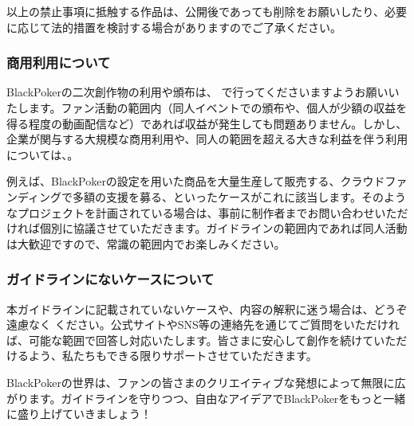 \documentclass[letterpaper,10pt,dvipdfmx]{sphinxmanual}
\begin{document}
\sphinxAtStartPar
以上の禁止事項に抵触する作品は、公開後であっても削除をお願いしたり、必要に応じて法的措置を検討する場合がありますのでご了承ください。


\subsubsection{商用利用について}
\label{\detokenize{appendix/guideline/fanworks:id7}}
\sphinxAtStartPar
BlackPokerの二次創作物の利用や頒布は、  で行ってくださいますようお願いいたします。ファン活動の範囲内（同人イベントでの頒布や、個人が少額の収益を得る程度の動画配信など）であれば収益が発生しても問題ありません。しかし、企業が関与する大規模な商用利用や、同人の範囲を超える大きな利益を伴う利用については、。

\sphinxAtStartPar
例えば、BlackPokerの設定を用いた商品を大量生産して販売する、クラウドファンディングで多額の支援を募る、といったケースがこれに該当します。そのようなプロジェクトを計画されている場合は、事前に制作者までお問い合わせいただければ個別に協議させていただきます。ガイドラインの範囲内であれば同人活動は大歓迎ですので、常識の範囲内でお楽しみください。


\subsubsection{ガイドラインにないケースについて}
\label{\detokenize{appendix/guideline/fanworks:id8}}
\sphinxAtStartPar
本ガイドラインに記載されていないケースや、内容の解釈に迷う場合は、どうぞ遠慮なく  ください。公式サイトやSNS等の連絡先を通じてご質問をいただければ、可能な範囲で回答し対応いたします。皆さまに安心して創作を続けていただけるよう、私たちもできる限りサポートさせていただきます。

\sphinxAtStartPar
BlackPokerの世界は、ファンの皆さまのクリエイティブな発想によって無限に広がります。ガイドラインを守りつつ、自由なアイデアでBlackPokerをもっと一緒に盛り上げていきましょう！

\sphinxstepscope
\end{document}

